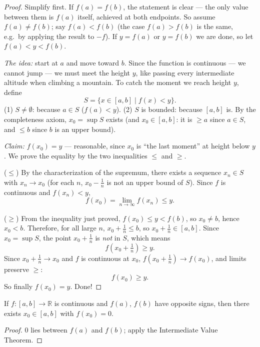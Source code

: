 \documentclass[11pt]{report}
\begin{document}
\begin{proof}
Simplify first. If $f(a) = f(b)$, the statement is clear --- the only value between them is $f(a)$ itself, achieved at both endpoints. So assume $f(a) \neq f(b)$; say $f(a) < f(b)$ (the case $f(a) > f(b)$ is the same, e.g.\ by applying the result to $-f$). If $y = f(a)$ or $y = f(b)$ we are done, so let $f(a) < y < f(b)$.

\emph{The idea:} start at $a$ and move toward $b$. Since the function is continuous --- we cannot jump --- we must meet the height $y$, like passing every intermediate altitude when climbing a mountain. To catch the moment we reach height $y$, define
\[
S = \{ x \in [a,b] \mid f(x) < y \}.
\]
(1) $S \neq \emptyset$: because $a \in S$ ($f(a) < y$). (2) $S$ is bounded: because $[a,b]$ is. By the completeness axiom, $x_0 = \sup S$ exists (and $x_0 \in [a,b]$: it is $\geq a$ since $a \in S$, and $\leq b$ since $b$ is an upper bound).

\emph{Claim: $f(x_0) = y$} --- reasonable, since $x_0$ is ``the last moment'' at height below $y$. We prove the equality by the two inequalities $\leq$ and $\geq$.

($\leq$) By the characterization of the supremum, there exists a sequence $x_n \in S$ with $x_n \to x_0$ (for each $n$, $x_0 - \tfrac1n$ is not an upper bound of $S$). Since $f$ is continuous and $f(x_n) < y$,
\[
f(x_0) = \lim_{n\to\infty} f(x_n) \leq y.
\]

($\geq$) From the inequality just proved, $f(x_0) \leq y < f(b)$, so $x_0 \neq b$, hence $x_0 < b$. Therefore, for all large $n$, $x_0 + \tfrac1n \leq b$, so $x_0 + \tfrac1n \in [a,b]$. Since $x_0 = \sup S$, the point $x_0 + \tfrac1n$ is \emph{not} in $S$, which means
\[
f\left(x_0 + \tfrac1n\right) \geq y.
\]
Since $x_0 + \tfrac1n \to x_0$ and $f$ is continuous at $x_0$, $f(x_0 + \tfrac1n) \to f(x_0)$, and limits preserve $\geq$:
\[
f(x_0) \geq y.
\]
So finally $f(x_0) = y$. Done!
\end{proof}

\begin{corbox}
If $f: [a,b] \to \mathbb{R}$ is continuous and $f(a)$, $f(b)$ have opposite signs, then there exists $x_0 \in [a,b]$ with $f(x_0) = 0$.
\end{corbox}

\begin{proof}
$0$ lies between $f(a)$ and $f(b)$; apply the Intermediate Value Theorem.
\end{proof}
\end{document}
